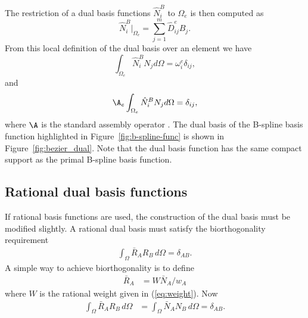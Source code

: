 The restriction of a \Bezier dual basis functions $\hat{N}_i^B$ to $\Omega_e$ is then computed as
\begin{equation}
    \hat{N}^B_i\vert_{\Omega_e}=\sum_{j=1}^m\hat{D}^e_{ij}B_j.\label{eq:bezier-dual-basis}
\end{equation}
From this local definition of the dual basis over an element we have
\begin{equation}
    \int_{\Omega_e}\hat{N}^B_iN_jd\Omega=\omega^e_i\delta_{ij},
\end{equation}
and
\begin{equation}
    \A_e{} \int_{\Omega_e}\hat{N}^B_iN_jd\Omega=\delta_{ij},
\end{equation}
where $\A$ is the standard assembly operator \cite{Hug00} . The \Bezier dual basis of the B-spline basis function highlighted in Figure~\ref{fig:b-spline-func} is shown in Figure~\ref{fig:bezier_dual}. Note that the \Bezier dual basis function has the same compact support as the primal B-spline basis function.

\subsection{Rational dual basis functions}
If rational basis functions are used, the construction of the dual basis must be modified slightly. A rational dual basis must satisfy the biorthogonality requirement
\begin{align}
    \int_{\Omega} \bar{R}_A R_B \, d\Omega= \delta_{AB}.
\end{align}
A simple way to achieve biorthogonality is to define
\begin{align}
    \bar{R}_A & = W \bar{N}_A/w_A
\end{align}
where $W$ is the rational weight given in (\ref{eq:weight}). Now
\begin{align}
    \int_{\Omega} \bar{R}_A R_B \, d\Omega & = \int_{\Omega} \bar{N}_A N_B \, d\Omega = \delta_{AB}.
\end{align}

